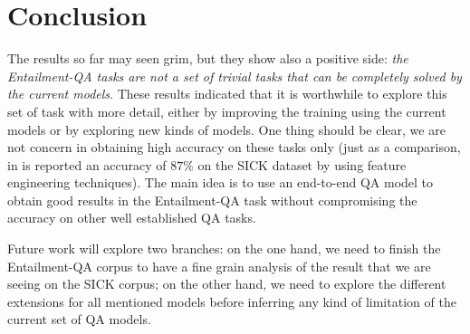 \chapter{Conclusion}
\label{ch05:conclusion}

The results so far may seen grim, but they show also a positive side: \textit{the Entailment-QA tasks are not a set of trivial tasks that can be completely solved by the current models}. These results indicated that it is worthwhile to explore this set of task with more detail, either by improving the training using the current models or by exploring new kinds of models. One thing should be clear, we are not concern in obtaining high accuracy on these tasks only (just as a comparison, in \cite{S14-2055} is reported an accuracy of $87\%$ on the SICK dataset by using feature engineering techniques). The main idea is to use an end-to-end QA model to obtain good results in the Entailment-QA task without compromising the accuracy on other well established QA tasks.  

Future work will explore two branches: on the one hand, we need to finish the Entailment-QA corpus to have a fine grain analysis of the result that we are seeing on the SICK corpus; on the other hand, we need to explore the different extensions for all mentioned models \cite{MaCKZRSG17, Serban:2016a} before inferring any kind of limitation of the current set of QA models.